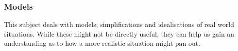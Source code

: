 \documentclass[12pt]{report}
\begin{document}
\begin{flushleft}
\subsubsection*{Models}
This subject deals with models; simplifications and idealisations of real world
situations. While these might not be directly useful, they can help us gain an
understanding as to how a more realistic situation might pan out.

\end{flushleft}
\end{document}
